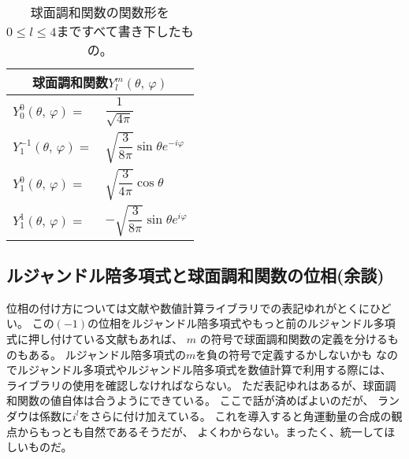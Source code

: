 \documentclass[../../master.tex]{subfiles}
\begin{document}
\begin{table}[h]
	\centering
	\caption{球面調和関数の関数形を
	\(0\leq l \leq 4\)まですべて書き下したもの。}
	\begin{tabular}[t]{ll}
		\hline
		\multicolumn{2}{c}{球面調和関数\(Y_l^m(\theta,\,\varphi)\)}\\
		\hline \hline
		\(Y_0^{0}(\theta,\,\varphi) =\) & \(\dfrac{1}{\sqrt{4\pi}}\)
		\rule[-6mm]{0mm}{12mm}\\
		\hline
		\(Y_1^{-1}(\theta,\,\varphi) =\) & \(\sqrt{\dfrac{3}{8\pi}}\sin\theta e^{-i\varphi}\)
		\rule[-6mm]{0mm}{12mm}\\
		\(Y_1^{0}(\theta,\,\varphi) =\) & \(\sqrt{\dfrac{3}{4\pi}}\cos\theta\)
		\rule[-6mm]{0mm}{12mm}\\
		\(Y_1^{1}(\theta,\,\varphi) =\) & \(-\sqrt{\dfrac{3}{8\pi}}\sin\theta e^{i\varphi}\)
		\rule[-6mm]{0mm}{12mm}\\
		\hline
	\end{tabular}
	\renewcommand{\arraystretch}{1.0}
\end{table}

\subsection{ルジャンドル陪多項式と球面調和関数の位相(余談)}

位相の付け方については文献や数値計算ライブラリでの表記ゆれがとくにひどい。
この\((-1)\)の位相をルジャンドル陪多項式やもっと前のルジャンドル多項式に押し付けている文献もあれば、
\(m\) の符号で球面調和関数の定義を分けるものもある。
ルジャンドル陪多項式の\(m\)を負の符号で定義するかしないかも
なのでルジャンドル多項式やルジャンドル陪多項式を数値計算で利用する際には、
ライブラリの使用を確認しなければならない。
ただ表記ゆれはあるが、球面調和関数の値自体は合うようにできている。
ここで話が済めばよいのだが、
ランダウは係数に\(i^l\)をさらに付け加えている。
これを導入すると角運動量の合成の観点からもっとも自然であるそうだが、
よくわからない。まったく、統一してほしいものだ。
\end{document}
